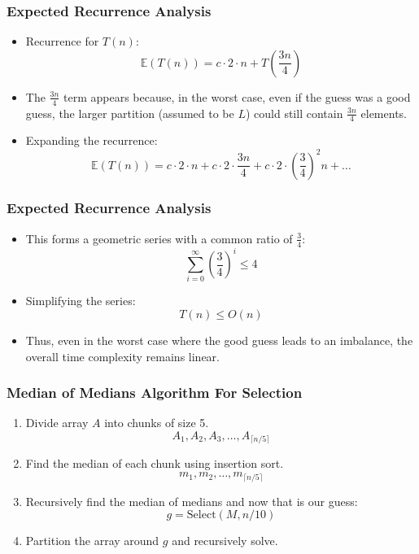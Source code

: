 \begin{frame}
    \frametitle{Expected Recurrence Analysis}
    \begin{itemize}
        \item Recurrence for \(T(n)\):
        \[
        \mathbb{E}(T(n)) = c \cdot 2 \cdot n + T\left(\frac{3n}{4}\right)
        \]
        \item The \( \frac{3n}{4} \) term appears because, in the worst case, even if the guess was a good guess, the larger partition (assumed to be \(L\)) could still contain \(\frac{3n}{4}\) elements.
        \vspace{0.4cm}
        \item Expanding the recurrence:
        \[
        \mathbb{E}(T(n)) = c \cdot 2 \cdot n + c \cdot 2 \cdot \frac{3n}{4} + c \cdot 2 \cdot \left(\frac{3}{4}\right)^2 n + \dots
        \]
            \end{itemize}
\end{frame}
\begin{frame}
    \frametitle{Expected Recurrence Analysis}
    \begin{itemize}
        \item This forms a geometric series with a common ratio of \(\frac{3}{4}\):
        \[
        \sum_{i=0}^{\infty} \left(\frac{3}{4}\right)^i \leq 4
        \]
        \item Simplifying the series:
        \[
        T(n) \leq O(n)
        \]
        \vspace{0.2cm}
        \item Thus, even in the worst case where the good guess leads to an imbalance, the overall time complexity remains linear.
    \end{itemize}
\end{frame}

\begin{frame}
    \frametitle{Median of Medians Algorithm For Selection}
    \begin{enumerate}
        \item Divide array \(A\) into chunks of size 5.
        \[
        A_1, A_2, A_3, \dots, A_{\lceil n/5 \rceil}
        \]
        \item Find the median of each chunk using insertion sort.
        \[
        m_1, m_2, \dots, m_{\lceil n/5 \rceil}
        \]
        \item Recursively find the median of medians and now that is our guess:
        \[
        g = \text{Select}(M, n/10)
        \]
        
        \item Partition the array around \(g\) and recursively solve.
    \end{enumerate}
\end{frame}

